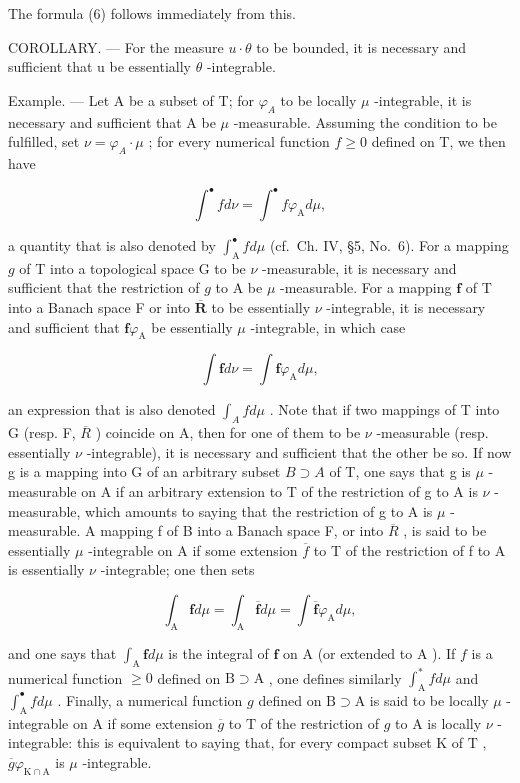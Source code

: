 The formula (6) follows immediately from this.

COROLLARY. --- For the measure \(u \cdot \theta\) to be bounded, it is necessary and sufficient that u be essentially \(\theta\) -integrable.

Example. --- Let A be a subset of T; for \(\varphi_{A}\) to be locally \(\mu\) -integrable, it is necessary and sufficient that A be \(\mu\) -measurable. Assuming the condition to be fulfilled, set \(\nu = \varphi_{A} \cdot \mu\) ; for every numerical function \(f \geqslant 0\) defined on T, we then have

\[
\int^ {\bullet} f d \nu = \int^ {\bullet} f \varphi_ {\mathrm{A}} d \mu ,
\]

a quantity that is also denoted by \(\int_{\mathrm{A}}^{\bullet}f d\mu\) (cf.~Ch. IV, §5, No.~6). For a mapping \(g\) of T into a topological space G to be \(\nu\) -measurable, it is necessary and sufficient that the restriction of \(g\) to A be \(\mu\) -measurable. For a mapping \(\mathbf{f}\) of T into a Banach space F or into \(\overline{\mathbf{R}}\) to be essentially \(\nu\) -integrable, it is necessary and sufficient that \(\mathbf{f}\varphi_{\mathrm{A}}\) be essentially \(\mu\) -integrable, in which case

\[
\int \mathbf {f} d \nu = \int \mathbf {f} \varphi_ {\mathrm{A}} d \mu ,
\]

an expression that is also denoted \(\int_{A} f d\mu\) . Note that if two mappings of T into G (resp. F, \(\overline{R}\) ) coincide on A, then for one of them to be \(\nu\) -measurable (resp. essentially \(\nu\) -integrable), it is necessary and sufficient that the other be so. If now g is a mapping into G of an arbitrary subset \(B \supset A\) of T, one says that g is \(\mu\) -measurable on A if an arbitrary extension to T of the restriction of g to A is \(\nu\) -measurable, which amounts to saying that the restriction of g to A is \(\mu\) -measurable. A mapping f of B into a Banach space F, or into \(\overline{R}\) , is said to be essentially \(\mu\) -integrable on A if some extension \(\overline{f}\) to T of the restriction of f to A is essentially \(\nu\) -integrable; one then sets

\[
\int_ {\mathrm{A}} \mathbf {f} d \mu = \int_ {\mathrm{A}} \overline {{\mathbf {f}}} d \mu = \int \overline {{\mathbf {f}}} \varphi_ {\mathrm{A}} d \mu ,
\]

and one says that \(\int_{\mathrm{A}} \mathbf{f} d\mu\) is the integral of \(\mathbf{f}\) on \(\mathrm{A}\) (or extended to \(\mathrm{A}\) ). If \(f\) is a numerical function \(\geqslant 0\) defined on \(\mathrm{B} \supset \mathrm{A}\) , one defines similarly \(\int_{\mathrm{A}}^{*} f d\mu\) and \(\int_{\mathrm{A}}^{\bullet} f d\mu\) . Finally, a numerical function \(g\) defined on \(\mathrm{B} \supset \mathrm{A}\) is said to be locally \(\mu\) -integrable on \(\mathrm{A}\) if some extension \(\overline{g}\) to \(\mathrm{T}\) of the restriction of \(g\) to \(\mathrm{A}\) is locally \(\nu\) -integrable: this is equivalent to saying that, for every compact subset \(\mathrm{K}\) of \(\mathrm{T}\) , \(\overline{g}\varphi_{\mathrm{K} \cap \mathrm{A}}\) is \(\mu\) -integrable.

